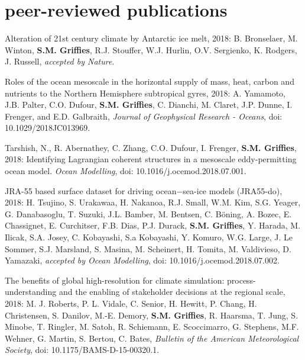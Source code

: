 \section*{\sc \color{Maroon} peer-reviewed publications}

\small 

\begin{etaremune}

\item Alteration of 21st century climate by Antarctic ice melt, 2018: B. Bronselaer, M. Winton, {\bf S.M. Grif\/f\/ies}, R.J. Stouffer, W.J. Hurlin, O.V. Sergienko, K. Rodgers, J. Russell, {\it accepted by Nature}.

\item Roles of the ocean mesoscale in the horizontal supply of mass, heat, carbon and nutrients to the Northern Hemisphere subtropical gyres, 2018: A. Yamamoto, J.B. Palter, C.O. Dufour, {\bf S.M. Grif\/f\/ies}, C. Dianchi, M. Claret, J.P. Dunne, I. Frenger, and E.D. Galbraith, {\it Journal of Geophysical Research - Oceans}, doi: 10.1029/2018JC013969.

\item Tarshish, N., R. Abernathey, C. Zhang, C.O. Dufour, I. Frenger, {\bf S.M. Grif\/f\/ies}, 2018: Identifying Lagrangian coherent structures in a mesoscale eddy-permitting ocean model. \textit{Ocean Modelling},
doi: 10.1016/j.ocemod.2018.07.001.

\item JRA-55 based surface dataset for driving ocean−sea-ice models (JRA55-do), 2018: H. Tsujino, S. Urakawaa, H. Nakanoa, R.J. Small, W.M. Kim, S.G. Yeager, G. Danabasoglu, T. Suzuki, J.L. Bamber, M. Bentsen, C. {B\"{o}ning}, A. Bozec, E. Chassignet, E. Curchitser, F.B. Dias, P.J. Durack, {\bf S.M. Grif\/f\/ies}, Y. Harada, M. Ilicak, S.A. Josey, C. Kobayashi, S.a Kobayashi, Y. Komuro, W.G. Large, J. {Le Sommer}, S.J. Marsland, S. Masina, M. Scheinert, H. Tomita, M. Valdivieso, D. Yamazaki, {\it accepted by Ocean Modelling}, 
doi: 10.1016/j.ocemod.2018.07.002.

\item The benefits of global high-resolution for climate simulation: process-understanding and the enabling of stakeholder decisions at the regional scale, 2018: M. J. Roberts, P. L. Vidale, C. Senior, H. Hewitt, P. Chang, H. Christensen, S. Danilov, M.-E. Demory, {\bf S.M. Grif\/f\/ies}, R. Haarsma, T. Jung, S. Minobe, T. Ringler, M. Satoh, R. Schiemann, E. Scoccimarro, G. Stephens, M.F. Wehner, G. Martin, S. Bertou, C. Bates, {\it Bulletin of the American Meteorological Society}, doi: 10.1175/BAMS-D-15-00320.1. 


\end{etaremune}
